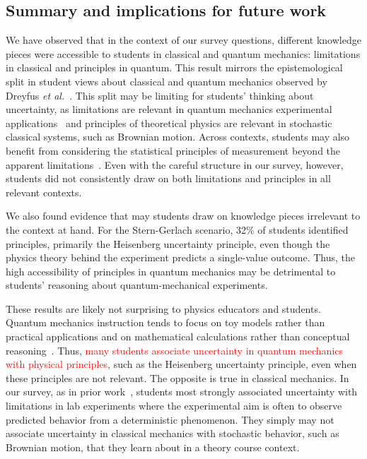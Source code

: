 \documentclass[english,aps,prstper,reprint,showpacs,longbibliography,superscriptaddress,nofootinbib]{revtex4-2}
\begin{document}
\subsection{Summary and implications for future work}

We have observed that in the context of our survey questions, different knowledge pieces were accessible to students in classical and quantum mechanics: limitations in classical and principles in quantum. This result mirrors the epistemological split in student views about classical and quantum mechanics observed by Dreyfus \textit{et al.}~\cite{Dreyfus2019}. This split may be limiting for students' thinking about uncertainty, as limitations are relevant in quantum mechanics experimental applications~\cite{Fox2020} and principles of theoretical physics are relevant in stochastic classical systems, such as Brownian motion. Across contexts, students may also benefit from considering the statistical principles of measurement beyond the apparent limitations~\cite{Evangelinos1999,Evangelinos2002,Allie2003,Pillay2008,Buffler2008}. Even with the careful structure in our survey, however, students did not consistently draw on both limitations and  principles in all relevant contexts.

We also found evidence that may students draw on knowledge pieces irrelevant to the context at hand. For the Stern-Gerlach scenario, 32\% of students identified principles, primarily the Heisenberg uncertainty principle, even though the physics theory behind the experiment predicts a single-value outcome. Thus, the high accessibility of principles in quantum mechanics may be detrimental to students' reasoning about quantum-mechanical experiments.

These results are likely not surprising to physics educators and students. Quantum mechanics instruction tends to focus on toy models rather than practical applications and on mathematical calculations rather than conceptual reasoning~\cite{Johansson2018}. Thus, \textcolor{red}{many students associate uncertainty in quantum mechanics with physical principles}, such as the Heisenberg uncertainty principle, even when these principles are not relevant. %
The opposite is true in classical mechanics. In our survey, as in prior work~\cite{Sere1993,Holmes2015}, students most strongly associated uncertainty with limitations in lab experiments where the experimental aim is often to observe predicted behavior from a deterministic phenomenon. They simply may not associate uncertainty in classical mechanics with stochastic behavior, such as Brownian motion, that they learn about in a theory course context.
\end{document}
